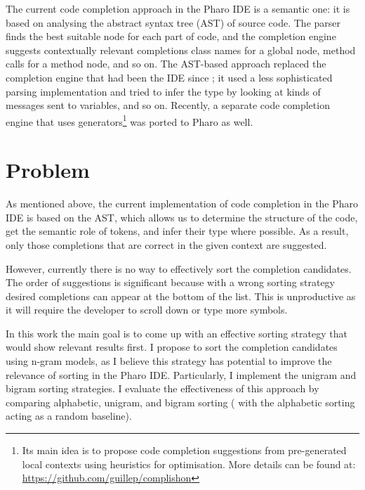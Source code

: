 The current code completion approach in the Pharo IDE is a semantic one: it is based on analysing the abstract syntax tree (AST) of source code. The parser finds the best suitable node for each part of code, and the completion engine suggests contextually relevant completions\insertion{:}  class names for a global node, method calls for a method node, and so on\remove{)}. The AST-based approach replaced the completion engine that had been  the  IDE  since  ; it used a less sophisticated parsing implementation and tried to infer the type by looking at kinds of messages sent to variables, and so on. Recently, a separate code completion engine that uses generators\footnote{Its main idea is to propose code completion suggestions from pre-generated local contexts using heuristics for optimisation. More details can be found at: \url{https://github.com/guillep/complishon}} was ported to Pharo as well.

\section{Problem}
\label{sec:Introduction-Problem}
As mentioned above, the current implementation of code completion in the Pharo IDE is based on the AST, which allows us to determine the structure of the code, get the semantic role of tokens, and infer their type where possible. As a result, only those completions that are correct in the given context are suggested.

However, currently there is no way to effectively sort the completion candidates. The order of suggestions is significant because with a wrong sorting strategy desired completions can appear at the bottom of the list. This is unproductive as it will require the developer to scroll down or type more symbols. 

In this work the main goal is to come up with an effective sorting strategy that would show relevant results first.   I propose to sort the completion candidates using n-gram models, as I believe this strategy has potential to improve the relevance of sorting in the Pharo IDE. Particularly, I implement the unigram and bigram sorting strategies.  I evaluate the effectiveness of this approach by comparing alphabetic, unigram, and bigram sorting ( with the alphabetic sorting acting as a random baseline).

